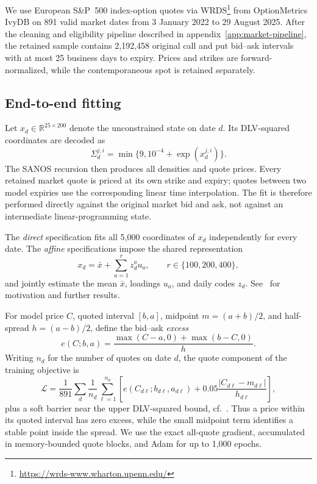 \documentclass[11pt]{article}
\newcommand{\abs}[1]{\lvert #1\rvert}
\theoremstyle{plain}
\theoremstyle{definition}
\theoremstyle{remark}
\begin{document}
We use European S\&P~500 index-option quotes via WRDS\footnote{\url{https://wrds-www.wharton.upenn.edu/}} from OptionMetrics IvyDB
on 891 valid market dates from 3 January 2022 to 29 August 2025.
After the cleaning and eligibility pipeline described in
appendix~\ref{app:market-pipeline}, the retained sample contains 2,192,458
original call and put bid--ask intervals with at most 25 business days to
expiry. Prices and strikes are forward-normalized, while the contemporaneous
spot is retained separately.


\subsection{End-to-end fitting}
\label{sec:estimation-fit}

Let $x_d\in\mathbb R^{25\times200}$ denote the unconstrained state on date
$d$. Its DLV-squared coordinates are decoded as
\[
  \Sigma_d^{j,i}=\min\{9,10^{-4}+\exp(x_d^{j,i})\}.
\]
The SANOS recursion then produces all densities and quote prices. Every
retained market quote is priced at its own strike and expiry; quotes between
two model expiries use the corresponding linear time interpolation. The fit is
therefore performed directly against the original market bid and ask, not
against an intermediate linear-programming state.

The \emph{direct} specification fits all 5,000 coordinates of $x_d$
independently for every date. The \emph{affine} specifications impose
the shared representation
\begin{equation}
  \label{eq:estimation-affine-state}
  x_d=\bar x+\sum_{a=1}^r z_d^a u_a,
  \qquad r\in\{100,200,400\},
\end{equation}
and jointly estimate the mean $\bar x$, loadings $u_a$, and daily codes $z_d$. See~\cite{DYSANOS2026}
for motivation and further results.

For model price $C$, quoted interval $[b,a]$, midpoint $m=(a+b)/2$, and
half-spread $h=(a-b)/2$, define the bid--ask \emph{excess}
\[
  e(C;b,a)=\frac{\max(C-a,0)+\max(b-C,0)}{h}.
\]
Writing $n_d$ for the number of quotes on date $d$, the quote component of the
training objective is
\begin{equation}
  \label{eq:estimation-quote-objective}
  \mathcal L
  =\frac1{891}\sum_d\frac1{n_d}\sum_{\ell=1}^{n_d}
    \left[
      e(C_{d\ell};b_{d\ell},a_{d\ell})
      +0.05\frac{\abs{C_{d\ell}-m_{d\ell}}}{h_{d\ell}}
    \right],
\end{equation}
plus a soft barrier near the upper DLV-squared bound, cf.~\cite{DYSANOS2026}. Thus a price within its
quoted interval has zero excess, while the small midpoint term identifies a
stable point inside the spread. We use the exact all-quote gradient, accumulated
in memory-bounded quote blocks, and Adam for up to 1,000 epochs.
\end{document}
